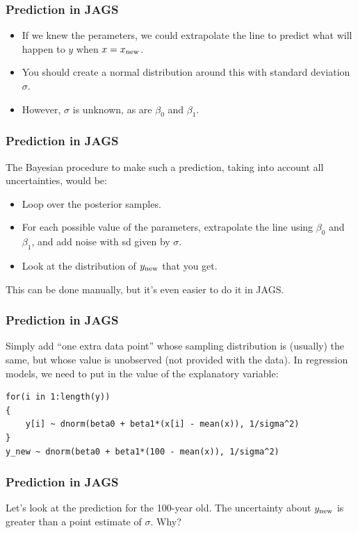 \documentclass{beamer}
\begin{document}
\begin{frame}
\frametitle{Prediction in JAGS}
\begin{itemize}
\item If we knew the perameters, we could extrapolate the line to predict
what will happen to $y$ when $x=x_{\rm new}$.\pause
\item You should create a normal distribution around this with standard deviation
$\sigma$.\pause
\item However, $\sigma$ is unknown, as are $\beta_0$ and $\beta_1$.
\end{itemize}
\end{frame}


\begin{frame}
\frametitle{Prediction in JAGS}
The Bayesian procedure to make such a prediction, taking into account all
uncertainties, would be:
\begin{itemize}
\item Loop over the posterior samples.\pause
\item For each possible value of the parameters,
extrapolate the line using $\beta_0$ and $\beta_1$, and add noise with sd
given by $\sigma$.\pause
\item Look at the distribution of $y_{\rm new}$ that you get.\pause
\end{itemize}
This can be done manually, but it's even easier to do it in JAGS.

\end{frame}



\begin{frame}[fragile]
\frametitle{Prediction in JAGS}
Simply add ``one extra data point'' whose sampling distribution is (usually)
the same, but whose value is unobserved (not provided with the data).
In regression models, we need to put in the value of the explanatory variable:
\begin{verbatim}
for(i in 1:length(y))
{
    y[i] ~ dnorm(beta0 + beta1*(x[i] - mean(x)), 1/sigma^2)
}
y_new ~ dnorm(beta0 + beta1*(100 - mean(x)), 1/sigma^2)
\end{verbatim}
\end{frame}


\begin{frame}[fragile]
\frametitle{Prediction in JAGS}
\large

Let's look at the prediction for the 100-year old.
The uncertainty about $y_{\rm new}$ is greater than
a point estimate of $\sigma$. Why?
\end{frame}
\end{document}
